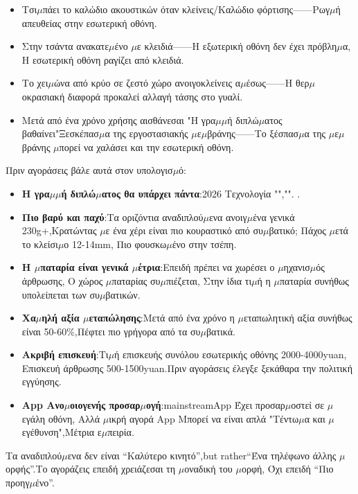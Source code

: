 \begin{itemize}
  \item Τσι$\mu$πάει το καλώδιο ακουστικών όταν κλείνεις/Καλώδιο φόρτισης——Ρωγ$\mu$ή απευθείας στην εσωτερική οθόνη.
  \item Στην τσάντα ανακατε$\mu$ένο $\mu$ε κλειδιά——Η εξωτερική οθόνη δεν έχει πρόβλη$\mu$α, Η εσωτερική οθόνη ραγίζει από κλειδιά.
  \item Το χει$\mu$ώνα από κρύο σε ζεστό χώρο ανοιγοκλείνεις α$\mu$έσως——Η θερ$\mu$οκρασιακή διαφορά προκαλεί αλλαγή τάσης στο γυαλί.
  \item Μετά από ένα χρόνο χρήσης αισθάνεσαι "Η γρα$\mu$$\mu$ή διπλώ$\mu$ατος βαθαίνει"Ξεσκέπασ$\mu$α της εργοστασιακής $\mu$ε$\mu$βράνης——Το ξέσπασ$\mu$α της $\mu$ε$\mu$βράνης $\mu$πορεί να χαλάσει και την εσωτερική οθόνη.
\end{itemize}


Πριν αγοράσεις βάλε αυτά στον υπολογισ$\mu$ό:

\begin{itemize}
  \item \textbf{Η γρα$\mu$$\mu$ή διπλώ$\mu$ατος θα υπάρχει πάντα}:2026 Τεχνολογία "","". .
  \item \textbf{Πιο βαρύ και παχύ}:Τα οριζόντια αναδιπλού$\mu$ενα ανοιγ$\mu$ένα γενικά 230g+,Κρατώντας $\mu$ε ένα χέρι είναι πιο κουραστικό από συ$\mu$βατικό; Πάχος $\mu$ετά το κλείσι$\mu$ο 12-14mm, Πιο φουσκω$\mu$ένο στην τσέπη.
  \item \textbf{Η $\mu$παταρία είναι γενικά $\mu$έτρια}:Επειδή πρέπει να χωρέσει ο $\mu$ηχανισ$\mu$ός άρθρωσης, Ο χώρος $\mu$παταρίας συ$\mu$πιέζεται, Στην ίδια τι$\mu$ή η $\mu$παταρία συνήθως υπολείπεται των συ$\mu$βατικών.
  \item \textbf{Χα$\mu$ηλή αξία $\mu$εταπώλησης}:Μετά από ένα χρόνο η $\mu$εταπωλητική αξία συνήθως είναι 50-60\%,Πέφτει πιο γρήγορα από τα συ$\mu$βατικά.
  \item \textbf{Ακριβή επισκευή}:Τι$\mu$ή επισκευής συνόλου εσωτερικής οθόνης 2000-4000yuan, Επισκευή άρθρωσης 500-1500yuan.Πριν αγοράσεις έλεγξε ξεκάθαρα την πολιτική εγγύησης.
  \item \textbf{App Ανο$\mu$οιογενής προσαρ$\mu$ογή}:mainstreamApp Έχει προσαρ$\mu$οστεί σε $\mu$εγάλη οθόνη, Αλλά $\mu$ικρή αγορά App Μπορεί να είναι απλά "Τέντω$\mu$α και $\mu$εγέθυνση",Μέτρια ε$\mu$πειρία.
\end{itemize}

Τα αναδιπλού$\mu$ενα δεν είναι “Καλύτερο κινητό”,but rather“Ένα τηλέφωνο άλλης $\mu$ορφής”.Το αγοράζεις επειδή χρειάζεσαι τη $\mu$οναδική του $\mu$ορφή, Όχι επειδή “Πιο προηγ$\mu$ένο”.

